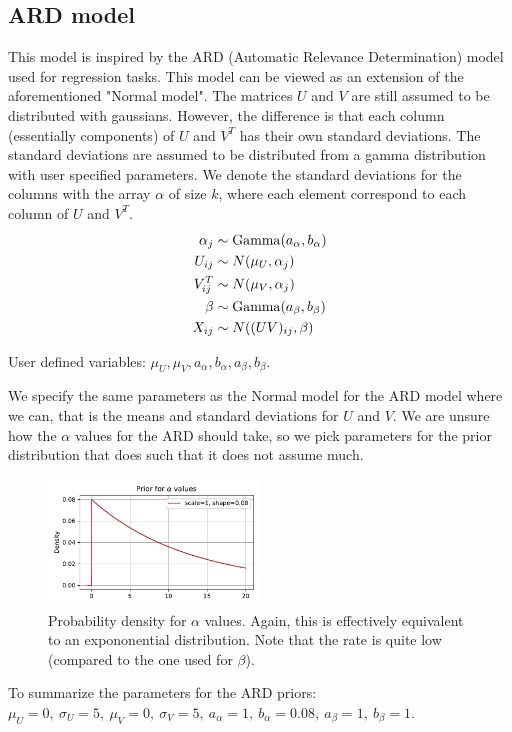\documentclass[12pt]{article}
\begin{document}
    \subsection{ARD model}
    This model is inspired by the ARD (Automatic Relevance Determination) model used for regression tasks. This model can be viewed as an extension of the aforementioned "Normal model". The matrices $U$ and $V$ are still assumed to be distributed with gaussians. However, the difference is that each column (essentially components) of $U$ and $V^T$ has their own standard deviations. The standard deviations are assumed to be distributed from a gamma distribution with user specified parameters. We denote the standard deviations for the columns with the array $\alpha$ of size $k$, where each element correspond to each column of $U$ and $V^T$.
    \begin{align*}
        \alpha_{j}  &\sim \operatorname{Gamma}(a_\alpha, b_\alpha) \\
        U_{ij}  &\sim N(\mu_U, \alpha_j) \\
        V^T_{ij}  &\sim N(\mu_V, \alpha_j) \\
        \beta  &\sim \operatorname{Gamma}(a_\beta, b_\beta) \\
        X_{ij} &\sim N((UV)_{ij}, \beta)
    \end{align*}

    User defined variables: $\mu_U, \mu_V, a_\alpha, b_\alpha, a_\beta, b_\beta$.
    
    \vspace{3mm}
    We specify the same parameters as the Normal model for the ARD model where we can, that is the means and standard deviations for $U$ and $V$. We are unsure how the $\alpha$ values for the ARD should take, so we pick parameters for the prior distribution that does such that it does not assume much. 
    \begin{figure}[H]
        \centering
        \includegraphics[width=0.5\textwidth]{alphaprior.pdf}
        \caption{Probability density for $\alpha$ values. Again, this is effectively equivalent to an expononential distribution. Note that the rate is quite low (compared to the one used for $\beta$).}
    \end{figure}
    To summarize the parameters for the ARD priors: $\mu_U=0,\ \sigma_U=5,\ \mu_V=0,\ \sigma_V=5,\ a_\alpha=1,\ b_\alpha=0.08, \ a_\beta=1,\ b_\beta=1$.
\end{document}
